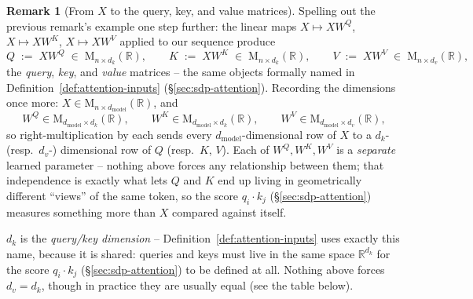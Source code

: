 \documentclass[11pt]{amsart}
\theoremstyle{plain}
\theoremstyle{definition}
\newtheorem{remark}[theorem]{Remark}
\newcommand{\R}{\mathbb{R}}
\newcommand{\Mat}[2]{\mathrm{M}_{#1 \times #2}(\R)}
\begin{document}
\begin{remark}[From $X$ to the query, key, and value matrices]
\label{rem:query-matrix}
Spelling out the previous remark's example one step further: the linear
maps $X \mapsto XW^Q$, $X \mapsto XW^K$, $X \mapsto XW^V$ applied to our
sequence produce
\[
    Q \;:=\; XW^Q \;\in\; \Mat{n}{d_k}, \qquad
    K \;:=\; XW^K \;\in\; \Mat{n}{d_k}, \qquad
    V \;:=\; XW^V \;\in\; \Mat{n}{d_v},
\]
the \emph{query}, \emph{key}, and \emph{value} matrices -- the same
objects formally named in Definition~\ref{def:attention-inputs}
(\S\ref{sec:sdp-attention}). Recording the dimensions once more:
$X \in \Mat{n}{d_{\mathrm{model}}}$, and
\[
    W^Q \in \Mat{d_{\mathrm{model}}}{d_k}, \qquad
    W^K \in \Mat{d_{\mathrm{model}}}{d_k}, \qquad
    W^V \in \Mat{d_{\mathrm{model}}}{d_v},
\]
so right-multiplication by each sends every $d_{\mathrm{model}}$-dimensional
row of $X$ to a $d_k$- (resp.\ $d_v$-) dimensional row of $Q$ (resp.\ $K$,
$V$). Each of $W^Q, W^K, W^V$ is a \emph{separate} learned parameter --
nothing above forces any relationship between them; that independence is
exactly what lets $Q$ and $K$ end up living in geometrically different
``views'' of the same token, so the score $q_i \cdot k_j$
(\S\ref{sec:sdp-attention}) measures something more than $X$ compared
against itself.

$d_k$ is the \emph{query/key dimension} -- Definition~\ref{def:attention-inputs}
uses exactly this name, because it is shared: queries and keys must live in
the same space $\R^{d_k}$ for the score $q_i \cdot k_j$
(\S\ref{sec:sdp-attention}) to be defined at all. Nothing above forces
$d_v = d_k$, though in practice they are usually equal (see the table
below).
\end{remark}
\end{document}
